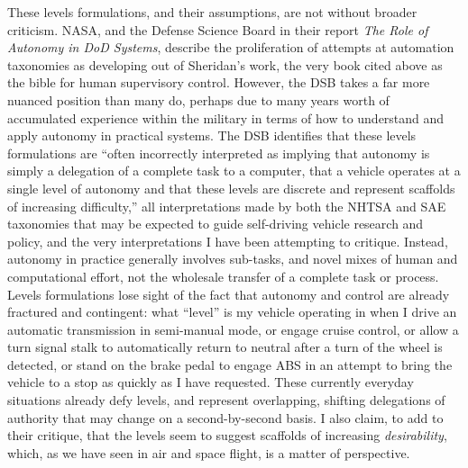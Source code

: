 These levels formulations, and their assumptions, are not without
broader criticism. NASA, and the Defense Science Board in their report
\emph{The Role of 
Autonomy in DoD Systems}, describe the proliferation of attempts at
automation taxonomies as developing out of Sheridan's work, the very
book cited above as the bible for human supervisory control.\cite{???}
However, the DSB takes a far more nuanced position than many do,
perhaps due to many years worth of accumulated experience within the
military in terms of how to understand and apply autonomy in practical
systems. The DSB
identifies that these levels formulations are ``often incorrectly
interpreted as implying that autonomy is simply a delegation of a
complete task to a computer, that a vehicle operates at a single level
of autonomy and that these levels are discrete and represent scaffolds
of increasing difficulty,''\cite{???} all interpretations made by both the
NHTSA and SAE taxonomies that may be expected to guide self-driving
vehicle research and policy, and the very interpretations I have been
attempting to critique. Instead, autonomy in practice generally
involves sub-tasks, and novel mixes of human and computational effort,
not the wholesale transfer of a complete task or process. Levels
formulations lose sight of the fact that autonomy and control are
already fractured and contingent:  what ``level'' is my vehicle
operating in when I drive an automatic transmission in semi-manual
mode, or engage cruise control, or allow a turn signal stalk to
automatically return to neutral after a turn of the wheel is detected,
or stand on the brake pedal to engage ABS in an attempt to bring the
vehicle to a stop as quickly as I have requested. These currently
everyday situations already defy levels, and represent overlapping, shifting
delegations of authority that may change on a second-by-second basis.
I also claim, to add to their critique, that the
levels seem to suggest scaffolds of increasing \emph{desirability},
which, as we have seen in air and space flight, is a matter of perspective.

